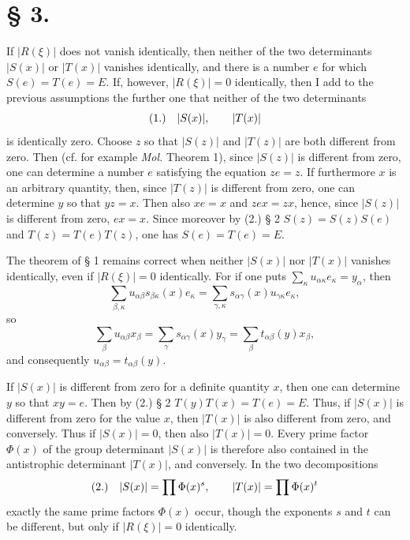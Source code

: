 \documentclass[11pt]{article}
\newcommand{\fnum}[1]{\textup{(\ensuremath{#1}.)}\quad}
\begin{document}
\section*{§ 3.}

If $|R(\xi)|$ does not vanish identically, then neither of the two determinants $|S(x)|$ or $|T(x)|$ vanishes identically, and there is a number $e$ for which $S(e)=T(e)=E$. If, however, $|R(\xi)|=0$ identically, then I add to the previous assumptions the further one that neither of the two determinants
\[
\fnum{1} |S(x)|,\qquad |T(x)|
\]
is identically zero. Choose $z$ so that $|S(z)|$ and $|T(z)|$ are both different from zero. Then (cf. for example \emph{Mol.} Theorem 1), since $|S(z)|$ is different from zero, one can determine a number $e$ satisfying the equation $ze=z$. If furthermore $x$ is an arbitrary quantity, then, since $|T(z)|$ is different from zero, one can determine $y$ so that $yz=x$. Then also $xe=x$ and $zex=zx$, hence, since $|S(z)|$ is different from zero, $ex=x$. Since moreover by (2.) § 2 $S(z)=S(z)S(e)$ and $T(z)=T(e)T(z)$, one has $S(e)=T(e)=E$.

The theorem of § 1 remains correct when neither $|S(x)|$ nor $|T(x)|$ vanishes identically, even if $|R(\xi)|=0$ identically. For if one puts $\sum_\kappa u_{\alpha\kappa}e_\kappa=y_\alpha$, then
\[
 \sum_{\beta,\kappa}u_{\alpha\beta}s_{\beta\kappa}(x)e_\kappa
 =\sum_{\gamma,\kappa}s_{\alpha\gamma}(x)u_{\gamma\kappa}e_\kappa,
\]
so
\[
 \sum_\beta u_{\alpha\beta}x_\beta=\sum_\gamma s_{\alpha\gamma}(x)y_\gamma=\sum_\beta t_{\alpha\beta}(y)x_\beta,
\]
and consequently $u_{\alpha\beta}=t_{\alpha\beta}(y)$.

If $|S(x)|$ is different from zero for a definite quantity $x$, then one can determine $y$ so that $xy=e$. Then by (2.) § 2 $T(y)T(x)=T(e)=E$. Thus, if $|S(x)|$ is different from zero for the value $x$, then $|T(x)|$ is also different from zero, and conversely. Thus if $|S(x)|=0$, then also $|T(x)|=0$. Every prime factor $\Phi(x)$ of the group determinant $|S(x)|$ is therefore also contained in the antistrophic determinant $|T(x)|$, and conversely. In the two decompositions
\[
\fnum{2} |S(x)|=\prod \Phi(x)^s,\qquad |T(x)|=\prod \Phi(x)^t
\]
exactly the same prime factors $\Phi(x)$ occur, though the exponents $s$ and $t$ can be different, but only if $|R(\xi)|=0$ identically.
\end{document}
